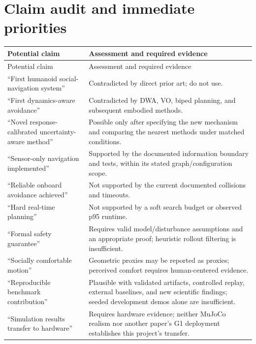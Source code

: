 \documentclass[11pt,a4paper]{article}
\begin{document}
\section{Claim audit and immediate priorities}
\begin{longtable}{P{0.43\textwidth}P{0.50\textwidth}}
\toprule
Potential claim & Assessment and required evidence \\
\midrule
\endfirsthead
\toprule Potential claim & Assessment and required evidence \\
\midrule
\endhead
\bottomrule
\endfoot
``First humanoid social-navigation system'' & Contradicted by direct prior art; do not use. \\
``First dynamics-aware avoidance'' & Contradicted by DWA, VO, biped planning, and subsequent embodied methods. \\
``Novel response-calibrated uncertainty-aware method'' & Possible only after specifying the new mechanism and comparing the nearest methods under matched conditions. \\
``Sensor-only navigation implemented'' & Supported by the documented information boundary and tests, within its stated graph/configuration scope. \\
``Reliable onboard avoidance achieved'' & Not supported by the current documented collisions and timeouts. \\
``Hard real-time planning'' & Not supported by a soft search budget or observed p95 runtime. \\
``Formal safety guarantee'' & Requires valid model/disturbance assumptions and an appropriate proof; heuristic rollout filtering is insufficient. \\
``Socially comfortable motion'' & Geometric proxies may be reported as proxies; perceived comfort requires human-centered evidence. \\
``Reproducible benchmark contribution'' & Plausible with validated artifacts, controlled replay, external baselines, and new scientific findings; seeded development demos alone are insufficient. \\
``Simulation results transfer to hardware'' & Requires hardware evidence; neither MuJoCo realism nor another paper's G1 deployment establishes this project's transfer. \\
\end{longtable}

\clearpage


\end{document}
